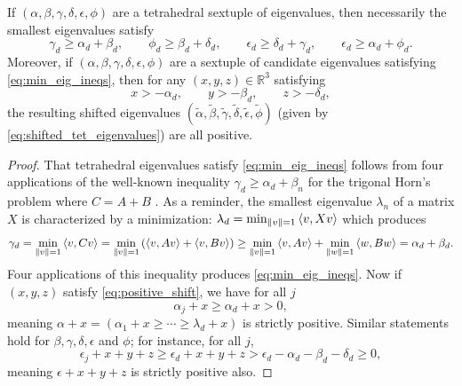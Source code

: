 \documentclass[notitlepage, 10pt]{article}
\begin{document}
\begin{cor}
    \label{cor:psd}
    If $(\alpha, \beta, \gamma, \delta, \epsilon, \phi)$ are a tetrahedral sextuple of eigenvalues, then necessarily the smallest eigenvalues satisfy
    \begin{equation}
        \label{eq:min_eig_ineqs}
        \gamma_d \geq \alpha_d + \beta_d, \qquad \phi_d \geq \beta_d + \delta_d, \qquad \epsilon_d \geq \delta_d + \gamma_d, \qquad \epsilon_d \geq \alpha_d + \phi_d.
    \end{equation}
    Moreover, if $(\alpha, \beta, \gamma, \delta, \epsilon, \phi)$ are a sextuple of candidate eigenvalues satisfying \cref{eq:min_eig_ineqs}, then for any $(x,y,z) \in \mathbb R^{3}$ satisfying
    \begin{equation}
        \label{eq:positive_shift}
        x > -\alpha_d, \qquad
        y > -\beta_d, \qquad
        z > -\delta_d,
    \end{equation}
    the resulting shifted eigenvalues $(\tilde \alpha, \tilde \beta, \tilde \gamma, \tilde \delta, \tilde \epsilon, \tilde \phi)$ (given by \cref{eq:shifted_tet_eigenvalues}) are all positive.
\end{cor}
\begin{proof}
    That tetrahedral eigenvalues satisfy \cref{eq:min_eig_ineqs} follows from four applications of the well-known inequality $\gamma_d \geq \alpha_d + \beta_n$ for the trigonal Horn's problem where $C=A+B$ \cite{bhatia2001linear}.
    As a reminder, the smallest eigenvalue $\lambda_n$ of a matrix $X$ is characterized by a minimization: $\lambda_d = \min_{\left\lVert v\right\rVert = 1} \braket{v, Xv}$ which produces
    \begin{equation}
        \gamma_d = \min_{\left\lVert v\right\rVert = 1} \braket{v, C v} = \min_{\left\lVert v\right\rVert = 1} \left(\braket{v, A v} + \braket{v, B v}\right) \geq \min_{\left\lVert v\right\rVert = 1} \braket{v, A v} + \min_{\left\lVert w\right\rVert = 1}\braket{w, B w} = \alpha_d + \beta_d.
    \end{equation}
    Four applications of this inequality produces \cref{eq:min_eig_ineqs}.
    Now if $(x,y,z)$ satisfy \cref{eq:positive_shift}, we have for all $j$
    \begin{equation}
        \alpha_j + x \geq \alpha_d + x > 0,
    \end{equation}
    meaning $\alpha+x = (\alpha_1 + x \geq \cdots \geq \lambda_d + x)$ is strictly positive.
    Similar statements hold for $\beta,\gamma,\delta, \epsilon$ and $\phi$; for instance, for all $j$,
    \begin{equation}
        \epsilon_j + x + y + z \geq \epsilon_d + x + y + z > \epsilon_d - \alpha_d - \beta_d - \delta_d \geq 0,
    \end{equation}
    meaning $\epsilon+x+y+z$ is strictly positive also.
\end{proof}
\end{document}
